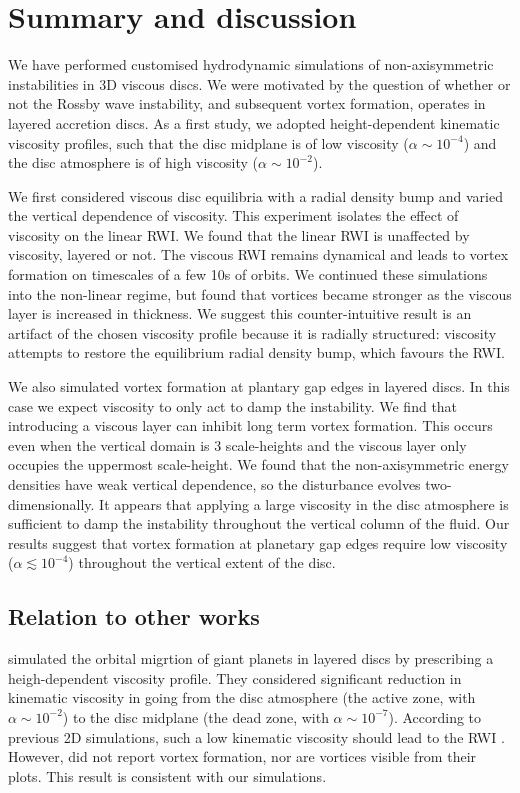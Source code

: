 \section{Summary and discussion}\label{summary}
We have performed customised hydrodynamic simulations of
non-axisymmetric instabilities in 3D viscous discs. We were motivated  
by the question of whether or not the Rossby wave instability, and
subsequent vortex formation, operates in layered accretion discs.  As
a first study, we adopted height-dependent kinematic viscosity
profiles, such that the disc midplane is of low viscosity ($\alpha\sim
10^{-4}$) and the disc atmosphere is of high viscosity ($\alpha\sim
10^{-2}$). 

We first considered viscous disc equilibria with a radial density
bump and varied the vertical dependence of viscosity. 
This experiment isolates the effect of viscosity on the
linear RWI. We found that the linear RWI is unaffected by viscosity,
layered or not. The viscous RWI remains dynamical and leads to vortex
formation on timescales of a few 10s of orbits. We continued these
simulations into the non-linear regime, but found that vortices became
stronger as the viscous layer is increased in thickness. We suggest this
counter-intuitive result is an artifact of the chosen viscosity
profile because it is radially structured: viscosity attempts to
restore the equilibrium radial density bump, which favours the
RWI. 

We also simulated vortex formation at plantary gap edges in layered
discs. In this case we expect viscosity to only act to damp the
instability. We find that introducing a viscous layer can inhibit long
term vortex formation. This occurs even when the vertical domain is 3
scale-heights and the viscous layer only occupies the uppermost
scale-height. We found that the non-axisymmetric energy densities have
weak vertical dependence, so the disturbance evolves
two-dimensionally. It appears that applying a large viscosity in the
disc atmosphere is sufficient to damp the instability throughout the
vertical column of the fluid. Our results suggest that vortex
formation at planetary gap edges require low viscosity
($\alpha\lesssim10^{-4}$) throughout the vertical extent of the
disc. 

\subsection{Relation to other works}
\cite{pierens10} simulated the orbital migrtion of giant planets in
layered discs by prescribing a heigh-dependent viscosity profile. They
considered significant reduction in kinematic viscosity in going from
the disc atmosphere (the active zone, with $\alpha\sim10^{-2}$) to the
disc midplane (the dead zone, with $\alpha\sim10^{-7}$). According to
previous 2D simulations, such a low kinematic viscosity should lead to
the RWI \citep{valborro06,valborro07}. However, \citeauthor{pierens10}
did not report vortex formation, nor are vortices visible from their
plots. This result is consistent with our simulations. 

